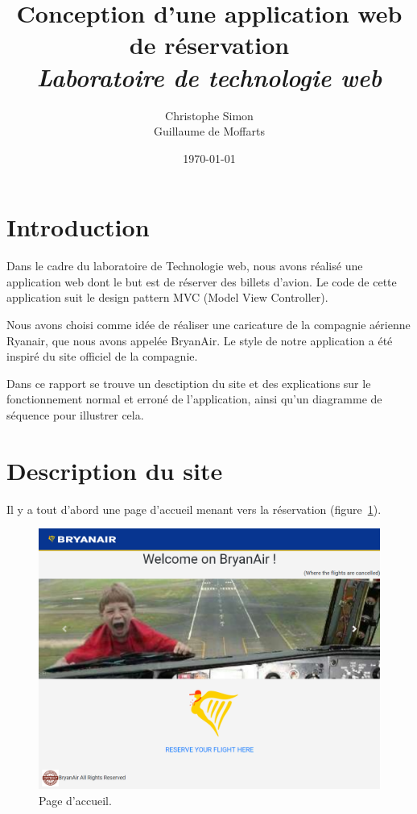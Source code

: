\documentclass[12pt,a4paper]{article}
\title{Conception d'une application web de réservation\\[3mm] \normalsize{\it Laboratoire de technologie web}}
\author{Christophe Simon \\ Guillaume de Moffarts}
\date{\today}
\begin{document}
	\maketitle
	\section*{Introduction}
		Dans le cadre du laboratoire de Technologie web, nous avons réalisé une application web dont le but est de réserver des billets d'avion. Le code de cette application suit le design pattern MVC (Model View Controller).

		Nous avons choisi comme idée de réaliser une caricature de la compagnie aérienne Ryanair, que nous avons appelée BryanAir. Le style de notre application a été inspiré du site officiel de la compagnie.

		Dans ce rapport se trouve un desctiption du site et des explications sur le fonctionnement normal et erroné de l'application, ainsi qu'un diagramme de séquence pour illustrer cela.


	\section{Description du site}
		Il y a tout d'abord une page d'accueil menant vers la réservation (figure~\ref{fig:home}).
		\begin{figure}[!p]
			\includegraphics[width=\textwidth]{home.png}
			\caption{Page d'accueil.}
			\label{fig:home}
		\end{figure}
\end{document}
